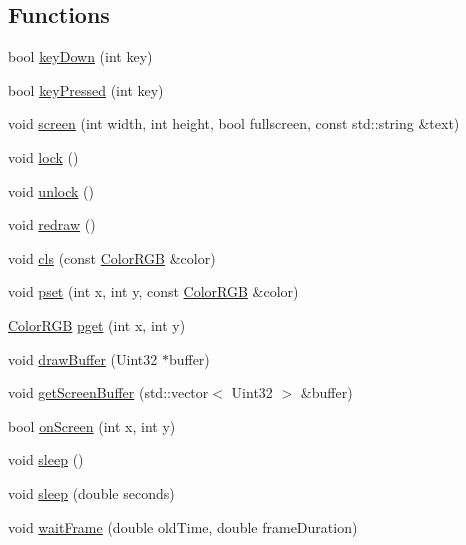 \subsection*{Functions}
\begin{DoxyCompactItemize}
\item 
bool \hyperlink{namespaceQuickCG_a3329a7af20dfe853cb5aa4476e12a6fc}{key\-Down} (int key)
\item 
bool \hyperlink{namespaceQuickCG_af364edceae6d91568589973b352f418e}{key\-Pressed} (int key)
\item 
void \hyperlink{namespaceQuickCG_ab709f7bbf43f41108128b0e82b88ac8e}{screen} (int width, int height, bool fullscreen, const std\-::string \&text)
\item 
void \hyperlink{namespaceQuickCG_a647150b9ad0e184c2db64880f02f9165}{lock} ()
\item 
void \hyperlink{namespaceQuickCG_ab9196e3f3753545b5bee982b4c589966}{unlock} ()
\item 
void \hyperlink{namespaceQuickCG_a5cb5ee8eac050ffb902ac96942cebc9f}{redraw} ()
\item 
void \hyperlink{namespaceQuickCG_aecc5906ca7d961e3a399af585c6573fc}{cls} (const \hyperlink{structQuickCG_1_1ColorRGB}{Color\-R\-G\-B} \&color)
\item 
void \hyperlink{namespaceQuickCG_a547bd88946eb65c1b9e1c8ddbd531e7f}{pset} (int x, int y, const \hyperlink{structQuickCG_1_1ColorRGB}{Color\-R\-G\-B} \&color)
\item 
\hyperlink{structQuickCG_1_1ColorRGB}{Color\-R\-G\-B} \hyperlink{namespaceQuickCG_ad609e260b8ddad24e1c4c5ac4d7b28b5}{pget} (int x, int y)
\item 
void \hyperlink{namespaceQuickCG_af12d4c92530c77cae9950bc293a6c605}{draw\-Buffer} (Uint32 $\ast$buffer)
\item 
void \hyperlink{namespaceQuickCG_a0e35a53fcdf7b29b3754645b84bc6df7}{get\-Screen\-Buffer} (std\-::vector$<$ Uint32 $>$ \&buffer)
\item 
bool \hyperlink{namespaceQuickCG_ac55d9505ff5750289d64a6986e8277a1}{on\-Screen} (int x, int y)
\item 
void \hyperlink{namespaceQuickCG_a5270b33c0975788752bf72ebbe72f812}{sleep} ()
\item 
void \hyperlink{namespaceQuickCG_a6d02c6302052c17f6edd76371d4ea56c}{sleep} (double seconds)
\item 
void \hyperlink{namespaceQuickCG_a414c0c6537c4f468aac581f513ff8773}{wait\-Frame} (double old\-Time, double frame\-Duration)
\item 

\end{DoxyCompactItemize}
